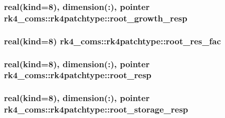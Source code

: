 \subsubsection[{root\+\_\+growth\+\_\+resp}]{\setlength{\rightskip}{0pt plus 5cm}real(kind=8), dimension(\+:), pointer rk4\+\_\+coms\+::rk4patchtype\+::root\+\_\+growth\+\_\+resp}\label{structrk4__coms_1_1rk4patchtype_a9312ce306daa7cdeed197c4fdfea3c85}
\hypertarget{structrk4__coms_1_1rk4patchtype_ac5ef1027d0c6d201ebfa3d7730a1d5f8}{}
\subsubsection[{root\+\_\+res\+\_\+fac}]{\setlength{\rightskip}{0pt plus 5cm}real(kind=8) rk4\+\_\+coms\+::rk4patchtype\+::root\+\_\+res\+\_\+fac}\label{structrk4__coms_1_1rk4patchtype_ac5ef1027d0c6d201ebfa3d7730a1d5f8}
\hypertarget{structrk4__coms_1_1rk4patchtype_a61b4b403f794441d2420c99c061f3e1a}{}
\subsubsection[{root\+\_\+resp}]{\setlength{\rightskip}{0pt plus 5cm}real(kind=8), dimension(\+:), pointer rk4\+\_\+coms\+::rk4patchtype\+::root\+\_\+resp}\label{structrk4__coms_1_1rk4patchtype_a61b4b403f794441d2420c99c061f3e1a}
\hypertarget{structrk4__coms_1_1rk4patchtype_a5594d09c2ea31dc5cff44a48480c1137}{}
\subsubsection[{root\+\_\+storage\+\_\+resp}]{\setlength{\rightskip}{0pt plus 5cm}real(kind=8), dimension(\+:), pointer rk4\+\_\+coms\+::rk4patchtype\+::root\+\_\+storage\+\_\+resp}\label{structrk4__coms_1_1rk4patchtype_a5594d09c2ea31dc5cff44a48480c1137}
\hypertarget{structrk4__coms_1_1rk4patchtype_a1f94e5b927bcab29c1ccdbbed961e4e7}{}
